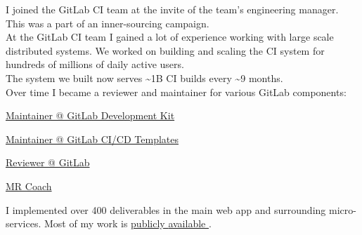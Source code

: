 \documentclass[]{matija-resume}
\begin{document}
\begin{minipage}[t]{1.0\textwidth}
\vspace{\topsep}
I joined the GitLab CI team at the invite of the team's engineering manager. This was a part of an inner-sourcing campaign.\\
\vspace{\topsep}
At the GitLab CI team I gained a lot of experience working with large scale distributed systems. We worked on building and scaling the CI system for hundreds of millions of daily active users.\\
\vspace{\topsep}
The system we built now serves \textasciitilde 1B CI builds every \textasciitilde 9 months.\\
\vspace{\topsep}
Over time I became a reviewer and maintainer for various GitLab components:
\vspace{\topsep}
\begin{tightemize}
\item \href{https://gitlab.com/gitlab-org/gitlab-development-kit/}{Maintainer @ GitLab Development Kit }
\item \href{https://gitlab.com/gitlab-org/gitlab/-/tree/master/lib/gitlab/ci/templates}{Maintainer @ GitLab CI/CD Templates }
\item \href{https://gitlab.com/gitlab-org/gitlab/}{Reviewer @ GitLab }
\item \href{https://about.gitlab.com/job-families/expert/merge-request-coach/}{MR Coach }
\end{tightemize}
\vspace{\topsep}
I implemented over 400 deliverables in the main web app and surrounding micro-services. Most of my work is \href{https://gitlab.com/gitlab-org/gitlab/-/merge_requests/?sort=updated_desc&state=merged&author_username=matteeyah&first_page_size=20}{publicly } \href{https://gitlab.com/gitlab-org/gitlab-foss/-/merge_requests?scope=all&state=merged&author_username=matteeyah}{available }.\\
\vspace{\topsep}
\sectionsep


\end{minipage}
\end{document}
